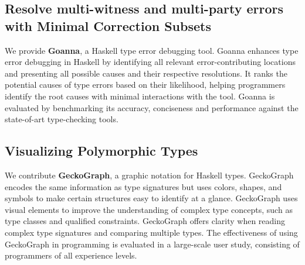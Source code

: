 
\subsection*{Resolve multi-witness and multi-party errors with Minimal Correction Subsets}

We provide \textbf{Goanna}, a Haskell type error debugging tool. Goanna enhances type error debugging in Haskell by identifying all relevant error-contributing locations and presenting all possible causes and their respective resolutions. It ranks the potential causes of type errors based on their likelihood, helping programmers identify the root causes with minimal interactions with the tool. Goanna is evaluated by benchmarking its accuracy, conciseness and performance against the state-of-art type-checking tools.



\subsection*{Visualizing Polymorphic Types}

We contribute \textbf{GeckoGraph}, a graphic notation for Haskell types. GeckoGraph encodes the same information as type signatures but uses colors, shapes, and symbols to make certain structures easy to identify at a glance. GeckoGraph uses visual elements to improve the understanding of complex type concepts, such as type classes and qualified constraints. GeckoGraph offers clarity when reading complex type signatures and comparing multiple types. The effectiveness of using GeckoGraph in programming is evaluated in a large-scale user study, consisting of programmers of all experience levels.

